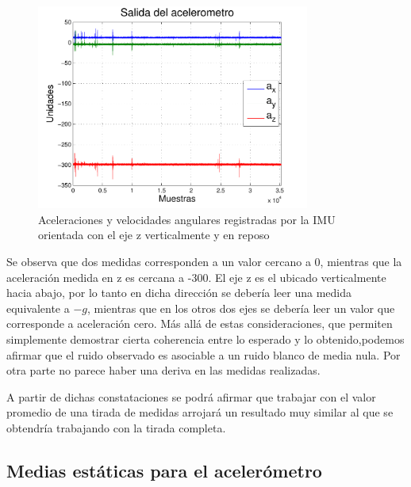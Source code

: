\documentclass[main]{subfiles}
\begin{document}
\begin{figure}[h!]
  \begin{center}
    \includegraphics[width=0.8\textwidth]{./pics_acc/1hora.pdf}
  \end{center}
  \vspace{-20pt}
  \caption{Aceleraciones y velocidades angulares registradas por la IMU orientada con el eje z verticalmente y en reposo}
  \label{fig:1hora}
\end{figure}

Se observa que dos medidas corresponden a un valor cercano a 0, mientras que la aceleración medida en z es cercana a -300. El eje z es el ubicado verticalmente hacia abajo, por lo tanto en dicha dirección se debería leer una medida equivalente a $-g$, mientras que en los otros dos ejes se debería leer un valor que corresponde a aceleración cero. Más allá de estas consideraciones, que permiten simplemente demostrar cierta coherencia entre lo esperado y lo obtenido,podemos afirmar que el ruido observado es asociable a un ruido blanco de media nula. Por otra parte no parece haber una deriva en las medidas realizadas. 

A partir de dichas constataciones se podrá afirmar que trabajar con el valor promedio de una tirada de medidas arrojará un resultado muy similar al que se obtendría trabajando con la tirada completa. 


\subsection{Medias estáticas para el acelerómetro}
\end{document}
